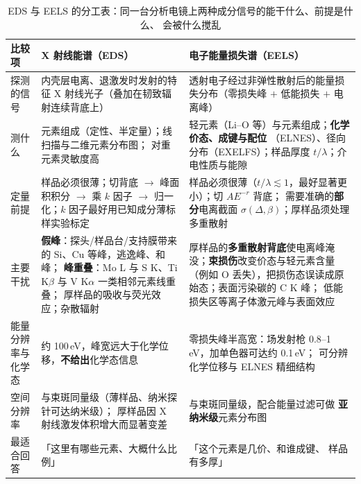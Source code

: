 \begin{table}[htbp]
\centering
\caption{EDS 与 EELS 的分工表：同一台分析电镜上两种成分信号的能干什么、前提是什么、
会被什么搅乱}
\label{tab:ch02b-eds-eels}
{\srcsize
\begin{tabularx}{\columnwidth}{@{}lXX@{}}
\toprule
比较项 & X 射线能谱（EDS） & 电子能量损失谱（EELS） \\
\midrule
探测的信号 & 内壳层电离、退激发时发射的特征 X 射线光子（叠加在韧致辐射连续背底上） &
透射电子经过非弹性散射后的能量损失分布（零损失峰 $+$ 低能损失 $+$ 电离峰） \\
测什么 & 元素组成（定性、半定量）；线扫描与二维元素分布图；
对重元素灵敏度高 & 轻元素（Li--O 等）与元素组成；\textbf{化学价态、成键与配位}
（ELNES）、径向分布（EXELFS）；样品厚度 $t/\lambda$；介电性质与能隙 \\
定量前提 & 样品必须很薄；切背底 $\rightarrow$ 峰面积积分 $\rightarrow$ 乘 $k$ 因子
$\rightarrow$ 归一化；$k$ 因子最好用已知成分薄标样实验标定 &
样品必须很薄（$t/\lambda\lesssim 1$，最好显著更小）；切 $AE^{-r}$ 背底；
需要准确的\textbf{部分}电离截面 $\sigma(\Delta,\beta)$；厚样品须处理多重散射 \\
主要干扰 & \textbf{假峰}：探头/样品台/支持膜带来的 Si、Cu 等峰，逃逸峰、和峰；
\textbf{峰重叠}：Mo L 与 S K、Ti K$\beta$ 与 V K$\alpha$ 一类相邻元素线重叠；
厚样品的吸收与荧光效应；杂散辐射 &
厚样品的\textbf{多重散射背底}使电离峰淹没；\textbf{束损伤}改变价态与轻元素含量
（例如 O 丢失），把损伤态误读成原始态；表面污染碳的 C K 峰；
低能损失区等离子体激元峰与表面效应 \\
能量分辨率与化学态 & 约 100\,eV，峰宽远大于化学位移，\textbf{不给出}化学态信息 &
零损失峰半高宽：场发射枪 0.8--1\,eV，加单色器可达约 0.1\,eV；
可分辨化学位移与 ELNES 精细结构 \\
空间分辨率 & 与束斑同量级（薄样品、纳米探针可达纳米级）；
厚样品因 X 射线激发体积增大而显著变差 & 与束斑同量级，配合能量过滤可做
\textbf{亚纳米级}元素分布图 \\
最适合回答 & 「这里有哪些元素、大概什么比例」 & 「这个元素是几价、和谁成键、
样品有多厚」 \\
\bottomrule
\end{tabularx}}
\end{table}

